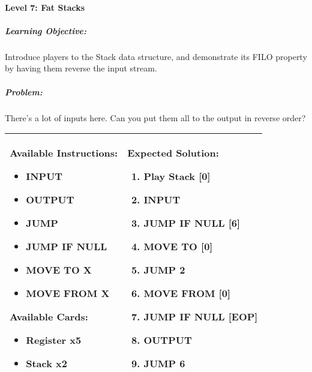 \paragraph{Level 7: Fat Stacks}
\subparagraph{Learning Objective:} Introduce players to the Stack data structure, and demonstrate its FILO property by having them reverse the input stream.

\subparagraph{Problem:} There's a lot of inputs here. Can you put them all to the output in reverse order?

\begin{center}
    \begin{tabular}{ | m{6cm} | m{8cm} | } 
        \hline
            \textbf{Available Instructions:} 
            \begin{itemize}
                \setlength\itemsep{-.35em}
                \item INPUT
                \item OUTPUT
                \item JUMP
                \item JUMP IF NULL
                \item MOVE TO X
                \item MOVE FROM X
            \end{itemize}
            \textbf{Available Cards:} 
            \begin{itemize}
                \setlength\itemsep{-.35em}
                \item Register x5
                \item Stack x2
            \end{itemize}& 
            \textbf{Expected Solution:} 
            \begin{enumerate}
                \setlength\itemsep{-.35em}
                \item Play Stack [0]
                \item INPUT
                \item JUMP IF NULL [6]
                \item MOVE TO [0]
                \item JUMP 2
                \item MOVE FROM [0]
                \item JUMP IF NULL [EOP]
                \item OUTPUT
                \item JUMP 6
            \end{enumerate}
            \\
        \hline
    \end{tabular}
\end{center}


